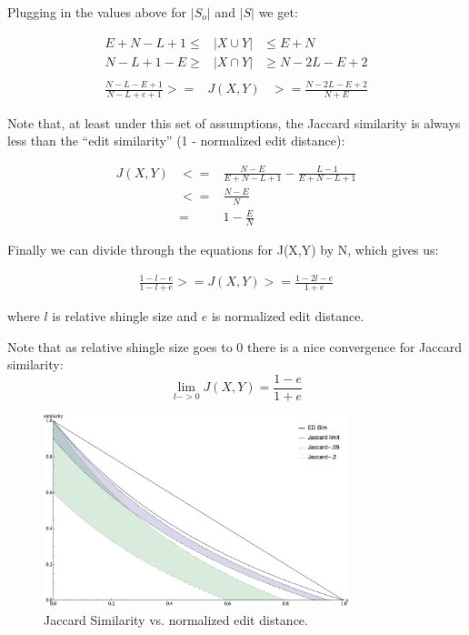 \documentclass{acm_proc_article-sp}
\begin{document}
Plugging in the values above for $|S_o|$ and $|S|$ we get:

\begin{eqnarray*}
E + N - L + 1  \le & |X \cup Y| & \le E + N \\
N - L + 1 - E  \ge & |X \cap Y| & \ge N - 2L - E + 2 \\
\end{eqnarray*}
\begin{eqnarray*}
\frac{N - L - E + 1 }{N - L + e + 1} >= & J(X,Y) & >= \frac{N - 2L - E + 2}{N + E}
\end{eqnarray*}

Note that, at least under this set of assumptions, the Jaccard similarity is always less than the ``edit similarity'' (1 - normalized edit distance):

\begin{eqnarray*}
J(X,Y) & <= & \frac{N - E}{E + N - L + 1} - \frac{L - 1}{E + N - L + 1} \\
       & <= & \frac{N - E}{N} \\ 
       & =  & 1 - \frac{E}{N}
\end{eqnarray*}

Finally we can divide through the equations for J(X,Y) by N, which gives us:

\begin{eqnarray*}
\frac{1 - l - e}{1 - l + e} >= J(X,Y) >= \frac{1 - 2l - e}{1 + e}
\end{eqnarray*}

where $l$ is relative shingle size and $e$ is normalized edit distance.

Note that as relative shingle size goes to 0 there is a nice convergence for Jaccard similarity:
\[\lim_{l->0}J(X,Y) = \frac{1 - e}{1 + e}\]

\begin{figure}
\centering
\includegraphics[width=3.5in, keepaspectratio = true]{jac-ed-chart.png}
\caption{Jaccard Similarity vs. normalized edit distance.}
\label{jac-ed}
\end{figure}
\end{document}
